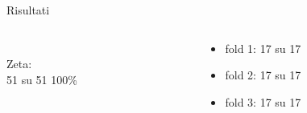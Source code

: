 \documentclass[hyperref={pdfpagelabels=false},slidestop,mathserif,red]{beamer}
\begin{document}
\begin{frame}[shrink]{Risultati}
\begin{block}{}
\begin{columns}[T]
\begin{column}[C]{2cm}
\ \\
\alert{Zeta:}\\
51 su 51 100\%
\end{column}
\begin{column}[TL]{8cm}
\begin{itemize}
 \item fold 1: 17 su 17
 \item fold 2: 17 su 17
 \item fold 3: 17 su 17
\end{itemize}
\end{column}
\end{columns}
\end{block}
\end{frame}
\end{document}
